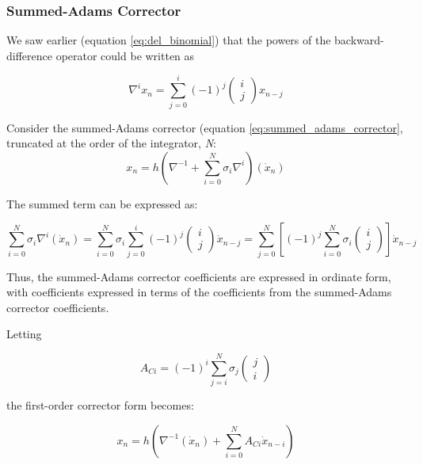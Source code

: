 \subsubsection{Summed-Adams Corrector}
We saw earlier (equation \ref{eq:del_binomial}) that the powers of the 
backward-difference operator could be written as

\begin{equation*}
\nabla ^{i}x_{n}=\sum
_{j=0}^{i}(-1)^{j}\left(\begin{matrix}i\\j\end{matrix}\right)x_{n-j}
\end{equation*}

Consider the summed-Adams corrector (equation \ref{eq:summed_adams_corrector},
truncated at the order of the integrator, \textit{N}:
\begin{equation*}
x_{n}=h\left(\nabla ^{-1}+\sum _{i=0}^{N}\sigma
_{i}\nabla ^{i}\right)(\dot{x}_{n})
\end{equation*}

The summed term can be expressed as:

\begin{equation*}
\sum _{i=0}^{N}\sigma _{i}\nabla ^{i}(\dot{x}_{n}) =
\sum _{i=0}^{N}\sigma_{i}\sum_{j=0}^{i}(-1)^{j}
\left(\begin{matrix}i\\j\end{matrix}\right)
\dot{x}_{n-j} = 
\sum_{j=0}^{N}\left[(-1)^{j}\sum _{i=0}^{N}\sigma_{i}
\left(\begin{matrix}i\\j\end{matrix}\right)\right]{\dot{x}}_{n-j}
\end{equation*}


Thus, the summed-Adams corrector coefficients are expressed in ordinate
form, with coefficients expressed in terms of the coefficients from the
summed-Adams corrector coefficients.

Letting

\begin{equation} \label{eq:A_Ci}
A_{Ci}=(-1)^{i}\sum _{j=i}^{N}\sigma
_{j}\left(\begin{matrix}j\\i\end{matrix}\right)
\end{equation}

the first-order corrector form becomes:

\begin{equation} \label{eq:sa_corr_form}
x_{n}=h\left(\nabla ^{-1}(\dot{x}_{n})+\sum
_{i=0}^{N}A_{Ci}{\dot{x}}_{n-i}\right)
\end{equation}

